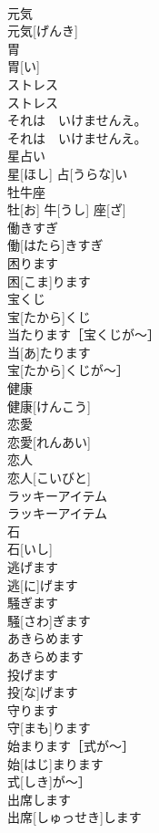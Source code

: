 \documentclass[8pt]{extreport}
\begin{document}
\begin{CJK}{UTF8}{min}
\\	元気	
\\	元気[げんき]	
\\	胃	
\\	胃[い]	
\\	ストレス	
\\	ストレス	
\\	それは　いけませんえ。	
\\	それは　いけませんえ。	
\\	星占い	
\\	星[ほし] 占[うらな]い	
\\	牡牛座	
\\	牡[お] 牛[うし] 座[ざ]	
\\	働きすぎ	
\\	働[はたら]きすぎ	
\\	困ります	
\\	困[こま]ります	
\\	宝くじ	
\\	宝[たから]くじ	
\\	当たります［宝くじが〜］	
\\	当[あ]たります
\\	宝[たから]くじが〜］	
\\	健康	
\\	健康[けんこう]	
\\	恋愛	
\\	恋愛[れんあい]	
\\	恋人	
\\	恋人[こいびと]	
\\	ラッキーアイテム	
\\	ラッキーアイテム	
\\	石	
\\	石[いし]	
\\	逃げます	
\\	逃[に]げます	
\\	騒ぎます	
\\	騒[さわ]ぎます	
\\	あきらめます	
\\	あきらめます	
\\	投げます	
\\	投[な]げます	
\\	守ります	
\\	守[まも]ります	
\\	始まります［式が〜］	
\\	始[はじ]まります
\\	式[しき]が〜］	
\\	出席します	
\\	出席[しゅっせき]します	

\end{CJK}
\end{document}
